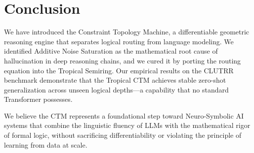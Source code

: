 \documentclass[11pt,a4paper]{article}
\begin{document}
\section{Conclusion}
We have introduced the Constraint Topology Machine, a differentiable geometric reasoning engine that separates logical routing from language modeling. We identified Additive Noise Saturation as the mathematical root cause of hallucination in deep reasoning chains, and we cured it by porting the routing equation into the Tropical Semiring. Our empirical results on the CLUTRR benchmark demonstrate that the Tropical CTM achieves stable zero-shot generalization across unseen logical depths—a capability that no standard Transformer possesses.

We believe the CTM represents a foundational step toward Neuro-Symbolic AI systems that combine the linguistic fluency of LLMs with the mathematical rigor of formal logic, without sacrificing differentiability or violating the principle of learning from data at scale.



\end{document}
